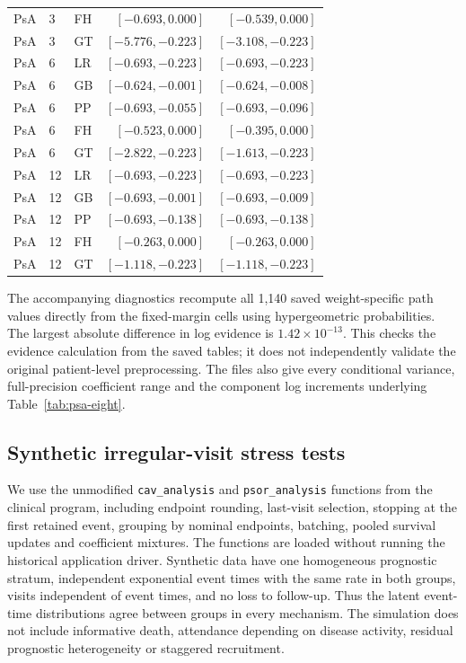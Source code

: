 \documentclass[12pt]{article}
\theoremstyle{definition}
\theoremstyle{remark}
\begin{document}
\begin{longtable}{lllr r}
PsA & 3 & FH & $[-0.693,0.000]$ & $[-0.539,0.000]$\\
PsA & 3 & GT & $[-5.776,-0.223]$ & $[-3.108,-0.223]$\\
PsA & 6 & LR & $[-0.693,-0.223]$ & $[-0.693,-0.223]$\\
PsA & 6 & GB & $[-0.624,-0.001]$ & $[-0.624,-0.008]$\\
PsA & 6 & PP & $[-0.693,-0.055]$ & $[-0.693,-0.096]$\\
PsA & 6 & FH & $[-0.523,0.000]$ & $[-0.395,0.000]$\\
PsA & 6 & GT & $[-2.822,-0.223]$ & $[-1.613,-0.223]$\\
PsA & 12 & LR & $[-0.693,-0.223]$ & $[-0.693,-0.223]$\\
PsA & 12 & GB & $[-0.693,-0.001]$ & $[-0.693,-0.009]$\\
PsA & 12 & PP & $[-0.693,-0.138]$ & $[-0.693,-0.138]$\\
PsA & 12 & FH & $[-0.263,0.000]$ & $[-0.263,0.000]$\\
PsA & 12 & GT & $[-1.118,-0.223]$ & $[-1.118,-0.223]$\\
\end{longtable}
\endgroup

The accompanying diagnostics recompute all 1,140 saved weight-specific path values directly from the fixed-margin cells using hypergeometric probabilities. The largest absolute difference in log evidence is $1.42\times10^{-13}$. This checks the evidence calculation from the saved tables; it does not independently validate the original patient-level preprocessing. The files also give every conditional variance, full-precision coefficient range and the component log increments underlying Table~\ref{tab:psa-eight}.

\subsection{Synthetic irregular-visit stress tests}
\label{sec:clinical-stress}

We use the unmodified \texttt{cav\_analysis} and \texttt{psor\_analysis} functions from the clinical program, including endpoint rounding, last-visit selection, stopping at the first retained event, grouping by nominal endpoints, batching, pooled survival updates and coefficient mixtures. The functions are loaded without running the historical application driver. Synthetic data have one homogeneous prognostic stratum, independent exponential event times with the same rate in both groups, visits independent of event times, and no loss to follow-up. Thus the latent event-time distributions agree between groups in every mechanism. The simulation does not include informative death, attendance depending on disease activity, residual prognostic heterogeneity or staggered recruitment.
\end{document}
